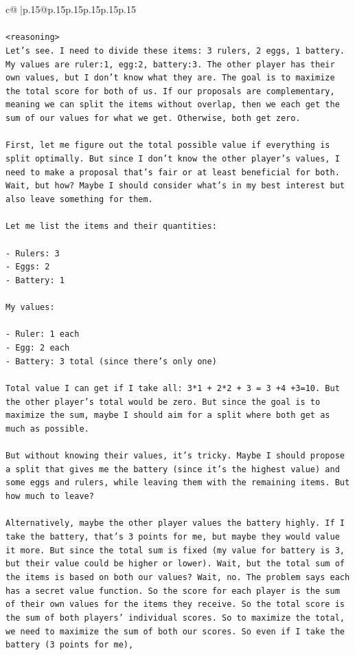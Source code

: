 \documentclass{article}
\begin{document}
{\begin{supertabular}{c@{$\;$}|p{.15\linewidth}@{}p{.15\linewidth}p{.15\linewidth}p{.15\linewidth}p{.15\linewidth}p{.15\linewidth}}
{{{\\ 
\\ 
\texttt{<reasoning>} \\
\texttt{Let's see. I need to divide these items: 3 rulers, 2 eggs, 1 battery. My values are ruler:1, egg:2, battery:3. The other player has their own values, but I don't know what they are. The goal is to maximize the total score for both of us. If our proposals are complementary, meaning we can split the items without overlap, then we each get the sum of our values for what we get. Otherwise, both get zero.} \\
\\ 
\texttt{First, let me figure out the total possible value if everything is split optimally. But since I don't know the other player's values, I need to make a proposal that's fair or at least beneficial for both. Wait, but how? Maybe I should consider what's in my best interest but also leave something for them.} \\
\\ 
\texttt{Let me list the items and their quantities:} \\
\\ 
\texttt{{-} Rulers: 3} \\
\texttt{{-} Eggs: 2} \\
\texttt{{-} Battery: 1} \\
\\ 
\texttt{My values:} \\
\\ 
\texttt{{-} Ruler: 1 each} \\
\texttt{{-} Egg: 2 each} \\
\texttt{{-} Battery: 3 total (since there's only one)} \\
\\ 
\texttt{Total value I can get if I take all: 3*1 + 2*2 + 3 = 3 +4 +3=10. But the other player's total would be zero. But since the goal is to maximize the sum, maybe I should aim for a split where both get as much as possible.} \\
\\ 
\texttt{But without knowing their values, it's tricky. Maybe I should propose a split that gives me the battery (since it's the highest value) and some eggs and rulers, while leaving them with the remaining items. But how much to leave?} \\
\\ 
\texttt{Alternatively, maybe the other player values the battery highly. If I take the battery, that's 3 points for me, but maybe they would value it more. But since the total sum is fixed (my value for battery is 3, but their value could be higher or lower). Wait, but the total sum of the items is based on both our values? Wait, no. The problem says each has a secret value function. So the score for each player is the sum of their own values for the items they receive. So the total score is the sum of both players' individual scores. So to maximize the total, we need to maximize the sum of both our scores. So even if I take the battery (3 points for me),} \\
}}}
\end{supertabular}}
\end{document}
